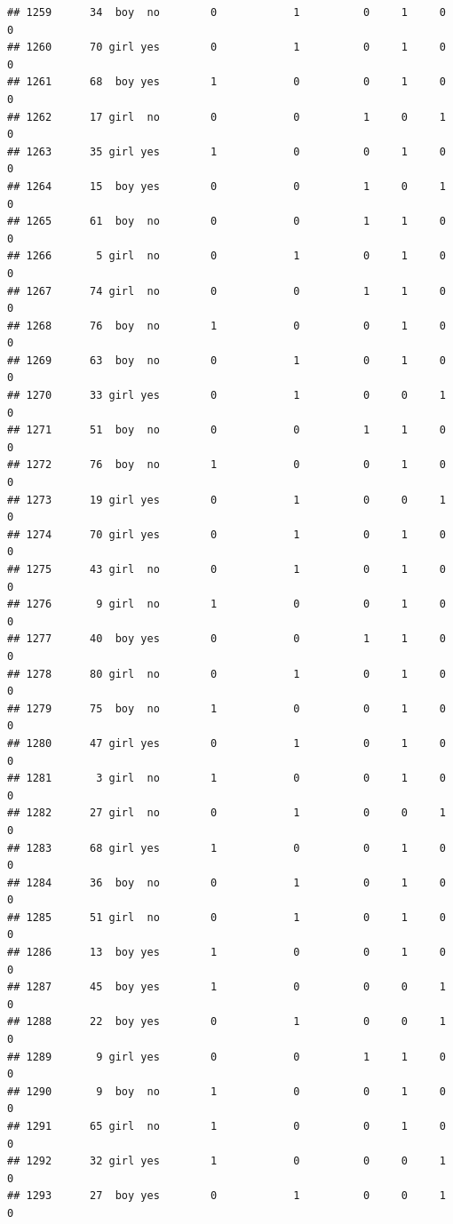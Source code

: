 \documentclass[man]{apa6}
\begin{document}
\begin{verbatim}
## 1259      34  boy  no        0            1          0     1     0     0
## 1260      70 girl yes        0            1          0     1     0     0
## 1261      68  boy yes        1            0          0     1     0     0
## 1262      17 girl  no        0            0          1     0     1     0
## 1263      35 girl yes        1            0          0     1     0     0
## 1264      15  boy yes        0            0          1     0     1     0
## 1265      61  boy  no        0            0          1     1     0     0
## 1266       5 girl  no        0            1          0     1     0     0
## 1267      74 girl  no        0            0          1     1     0     0
## 1268      76  boy  no        1            0          0     1     0     0
## 1269      63  boy  no        0            1          0     1     0     0
## 1270      33 girl yes        0            1          0     0     1     0
## 1271      51  boy  no        0            0          1     1     0     0
## 1272      76  boy  no        1            0          0     1     0     0
## 1273      19 girl yes        0            1          0     0     1     0
## 1274      70 girl yes        0            1          0     1     0     0
## 1275      43 girl  no        0            1          0     1     0     0
## 1276       9 girl  no        1            0          0     1     0     0
## 1277      40  boy yes        0            0          1     1     0     0
## 1278      80 girl  no        0            1          0     1     0     0
## 1279      75  boy  no        1            0          0     1     0     0
## 1280      47 girl yes        0            1          0     1     0     0
## 1281       3 girl  no        1            0          0     1     0     0
## 1282      27 girl  no        0            1          0     0     1     0
## 1283      68 girl yes        1            0          0     1     0     0
## 1284      36  boy  no        0            1          0     1     0     0
## 1285      51 girl  no        0            1          0     1     0     0
## 1286      13  boy yes        1            0          0     1     0     0
## 1287      45  boy yes        1            0          0     0     1     0
## 1288      22  boy yes        0            1          0     0     1     0
## 1289       9 girl yes        0            0          1     1     0     0
## 1290       9  boy  no        1            0          0     1     0     0
## 1291      65 girl  no        1            0          0     1     0     0
## 1292      32 girl yes        1            0          0     0     1     0
## 1293      27  boy yes        0            1          0     0     1     0

\end{verbatim}
\end{document}
